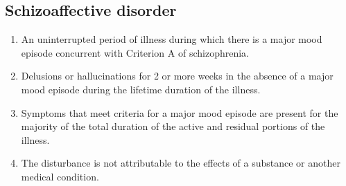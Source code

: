 \documentclass{article}
\begin{document}
\subsection{Schizoaffective disorder}
\begin{enumerate}
    \item An uninterrupted period of illness during which there is a major
        mood episode concurrent with Criterion A of schizophrenia.
    \item Delusions or hallucinations for 2 or more weeks in the absence of
        a major mood episode during the lifetime duration of the illness.
    \item Symptoms that meet criteria for a major mood episode are present
        for the majority of the total duration of the active and residual
        portions of the illness.
    \item The disturbance is not attributable to the effects of a substance
        or another medical condition.
\end{enumerate}
\end{document}
